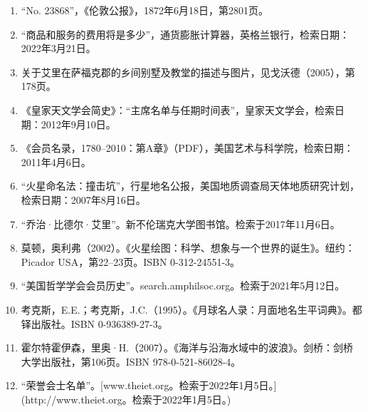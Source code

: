 \begin{enumerate}
\item “No. 23868”，《伦敦公报》，1872年6月18日，第2801页。
\item “商品和服务的费用将是多少”，通货膨胀计算器，英格兰银行，检索日期：2022年3月21日。
\item 关于艾里在萨福克郡的乡间别墅及教堂的描述与图片，见戈沃德（2005），第178页。
\item 《皇家天文学会简史》：“主席名单与任期时间表”，皇家天文学会，检索日期：2012年9月10日。
\item 《会员名录，1780–2010：第A章》（PDF），美国艺术与科学院，检索日期：2011年4月6日。
\item “火星命名法：撞击坑”，行星地名公报，美国地质调查局天体地质研究计划，检索日期：2007年8月16日。
\item “乔治·比德尔·艾里”。新不伦瑞克大学图书馆。检索于2017年11月6日。
\item 莫顿，奥利弗（2002）。《火星绘图：科学、想象与一个世界的诞生》。纽约：Picador USA，第22–23页。ISBN 0-312-24551-3。
\item “美国哲学学会会员历史”。search.amphilsoc.org。检索于2021年5月12日。
\item 考克斯，E.E.；考克斯，J.C.（1995）。《月球名人录：月面地名生平词典》。都铎出版社。ISBN 0-936389-27-3。
\item 霍尔特霍伊森，里奥·H.（2007）。《海洋与沿海水域中的波浪》。剑桥：剑桥大学出版社，第106页。ISBN 978-0-521-86028-4。
\item “荣誉会士名单”。[www.theiet.org。检索于2022年1月5日。](http://www.theiet.org。检索于2022年1月5日。)

\end{enumerate}